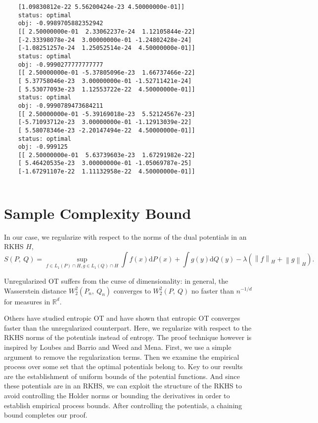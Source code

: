 \begin{lstlisting}
	[1.09830812e-22 5.56200424e-23 4.50000000e-01]]
	status: optimal
	obj: -0.9989705882352942
	[[ 2.50000000e-01  2.33062237e-24  1.12105844e-22]
	[-2.33398078e-24  3.00000000e-01 -1.24802428e-24]
	[-1.08251257e-24  1.25052514e-24  4.50000000e-01]]
	status: optimal
	obj: -0.9990277777777777
	[[ 2.50000000e-01 -5.37805096e-23  1.66737466e-22]
	[ 5.37758046e-23  3.00000000e-01 -1.52711421e-24]
	[ 5.53077093e-23  1.12553722e-22  4.50000000e-01]]
	status: optimal
	obj: -0.9990789473684211
	[[ 2.50000000e-01 -5.39169018e-23  5.52124567e-23]
	[-5.71093712e-23  3.00000000e-01 -1.12913039e-22]
	[ 5.58078346e-23 -2.20147494e-22  4.50000000e-01]]
	status: optimal
	obj: -0.999125
	[[ 2.50000000e-01  5.63739603e-23  1.67291982e-22]
	[ 5.46420535e-23  3.00000000e-01 -1.05069787e-25]
	[-1.67291107e-22  1.11132958e-22  4.50000000e-01]]
	
\end{lstlisting}


\section{Sample Complexity Bound}
	In our case, we regularize with respect to the norms of the dual potentials in an RKHS $H$,
	$$S(P,\displaystyle \ Q)=\sup_{f\in L_{1}(P) \cap H,g\in L_{1}(Q) \cap H}\int f(x)\mathrm{d}P(x)+\int g(y)\mathrm{d}Q(y)-\lambda(\left\|f\right\|_H+\left\|g\right\|_H).$$
	
	
	Unregularized OT suffers from the curse of dimensionality: in general, the Wasserstein distance $W_{2}^{2}(P_{n},\ Q_{n})$ converges to $W_{2}^{2}(P,\ Q)$ no faster than $n^{-1/d}$ for measures in $\mathbb{R}^{d}.$
	
	Others have studied entropic OT and have shown that entropic OT converges faster than the unregularized counterpart. Here, we regularize with respect to the RKHS norms of the potentials instead of entropy. The proof technique however is inspired by Loubes and Barrio and Weed and Mena. First, we use a simple argument to remove the regularization terms. Then we examine the empirical process over some set that the optimal potentials belong to. Key to our results are the establishment of uniform bounds of the potential functions. And since these potentials are in an RKHS, we can exploit the structure of the RKHS to avoid controlling the Holder norms or bounding the derivatives in order to establish empirical process bounds. After controlling the potentials, a chaining bound completes our proof.
	

